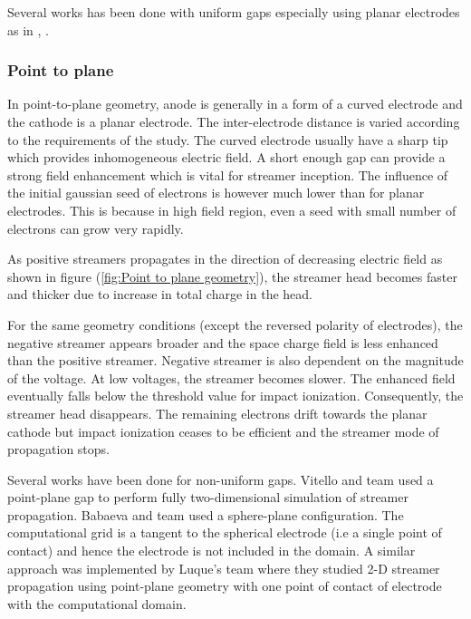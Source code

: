 \documentclass[paper=a4, fontsize=13pt]{scrartcl}
\begin{document}
Several works has been done with uniform gaps especially using planar electrodes as in \cite{Kulikovsky1997PositiveAir}, \cite{Pancheshnyi2008NumericalRefinement}. 


\subsubsection{Point to plane}

  In point-to-plane geometry, anode is generally in a form of a curved electrode and the cathode is a planar electrode.  The inter-electrode distance is varied according to the requirements of the study. The curved electrode usually have a sharp tip which provides inhomogeneous electric field. A short enough gap can provide a strong field enhancement which is vital for streamer inception. The influence of the initial gaussian seed of electrons is however much lower than for planar electrodes. This is because in high field region, even a seed with small number of electrons can grow very rapidly. 
  
  As positive streamers propagates in the direction of decreasing electric field as shown in figure (\ref{fig:Point to plane geometry}), the streamer head becomes faster and thicker due to increase in total charge in the head. 

  For the same geometry conditions (except the reversed polarity of electrodes), the negative streamer appears broader and the space charge field is less enhanced than the positive streamer. Negative streamer is also dependent on the magnitude of the voltage. At low voltages, the streamer becomes slower. The enhanced field eventually falls below the threshold value for impact ionization. Consequently, the streamer head disappears. The remaining electrons drift towards the planar cathode but impact ionization ceases to be efficient and the streamer mode of propagation stops.

   Several works have been done for non-uniform gaps. Vitello and team \cite{Vitello1994SimulationNitrogen} used a point-plane gap to perform fully two-dimensional simulation of streamer propagation. Babaeva and team \cite{Babaeva1996Two-dimensionalAir} used a sphere-plane configuration. The computational grid is a tangent to the spherical electrode (i.e a single point of contact) and hence the electrode is not included in the domain. A similar approach was implemented by Luque's team \cite{Luque2008PositiveVelocities} where they studied 2-D streamer propagation using point-plane geometry with one point of contact of electrode with the computational domain. 
   
\end{document}
